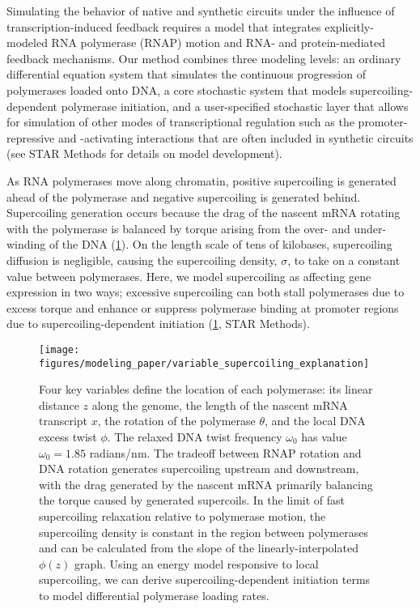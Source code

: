 \documentclass[11pt]{article} %
\begin{document}
Simulating the behavior of native and synthetic circuits under the influence of transcription-induced feedback requires a model that integrates explicitly-modeled RNA polymerase (RNAP) motion and RNA- and protein-mediated feedback mechanisms.
Our method combines three modeling levels: an ordinary differential equation system that simulates the continuous progression of polymerases loaded onto DNA, a core stochastic system that models supercoiling-dependent polymerase initiation, and a user-specified stochastic layer that allows for simulation of other modes of transcriptional regulation such as the promoter-repressive and -activating interactions that are often included in synthetic circuits (see STAR Methods for details on model development).

As RNA polymerases move along chromatin, positive supercoiling is generated ahead of the polymerase and negative supercoiling is generated behind. Supercoiling generation occurs because the drag of the nascent mRNA rotating with the polymerase is balanced by torque arising from the over- and under-winding of the DNA (\cref{fig:key_variables_diagram}). On the length scale of tens of kilobases, supercoiling diffusion is negligible, causing the supercoiling density, \(\sigma\), to take on a constant value between polymerases. Here, we model supercoiling as affecting gene expression in two ways; excessive supercoiling can both stall polymerases due to excess torque and enhance or suppress polymerase binding at promoter regions due to supercoiling-dependent initiation (\cref{fig:key_variables_diagram}, STAR Methods).

\begin{figure}[htb]
    \centering
    \texttt{[image: figures/modeling\_paper/variable\_supercoiling\_explanation]}
    \caption{Four key variables define the location of each polymerase: its linear distance \(z\) along the genome, the length of the nascent mRNA transcript \(x\), the rotation of the polymerase \(\theta\), and the local DNA excess twist \(\phi\). The relaxed DNA twist frequency \(\omega_0\) has value \(\omega_0 = 1.85\) radians/nm. The tradeoff between RNAP rotation and DNA rotation generates supercoiling upstream and downstream, with the drag generated by the nascent mRNA primarily balancing the torque caused by generated supercoils. In the limit of fast supercoiling relaxation relative to polymerase motion, the supercoiling density is constant in the region between polymerases and can be calculated from the slope of the linearly-interpolated \(\phi(z)\) graph. Using an energy model responsive to local supercoiling, we can derive supercoiling-dependent initiation terms to model differential polymerase loading rates.}
    \label{fig:key_variables_diagram}
\end{figure}
\end{document}
